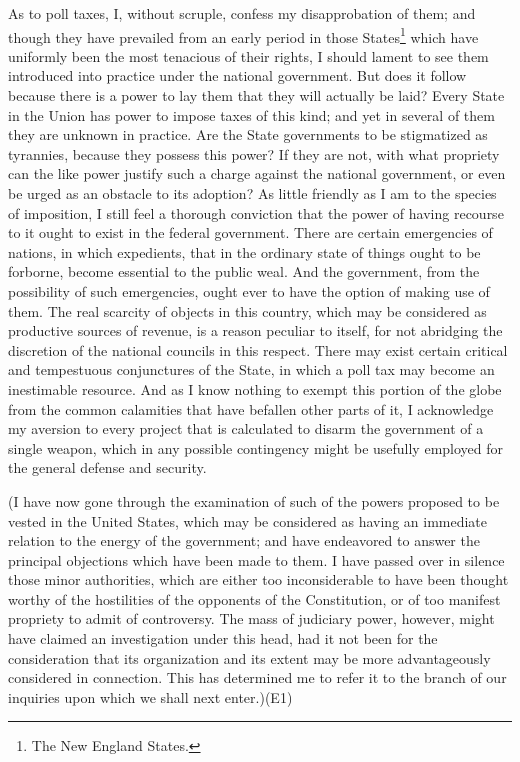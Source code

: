 As to poll taxes, I, without scruple, confess my disapprobation of them; and though they have prevailed from an early period in those States\footnote{The New England States.} which have uniformly been the most tenacious of their rights, I should lament to see them introduced into practice under the national government. But does it follow because there is a power to lay them that they will actually be laid? Every State in the Union has power to impose taxes of this kind; and yet in several of them they are unknown in practice. Are the State governments to be stigmatized as tyrannies, because they possess this power? If they are not, with what propriety can the like power justify such a charge against the national government, or even be urged as an obstacle to its adoption? As little friendly as I am to the species of imposition, I still feel a thorough conviction that the power of having recourse to it ought to exist in the federal government. There are certain emergencies of nations, in which expedients, that in the ordinary state of things ought to be forborne, become essential to the public weal. And the government, from the possibility of such emergencies, ought ever to have the option of making use of them. The real scarcity of objects in this country, which may be considered as productive sources of revenue, is a reason peculiar to itself, for not abridging the discretion of the national councils in this respect. There may exist certain critical and tempestuous conjunctures of the State, in which a poll tax may become an inestimable resource. And as I know nothing to exempt this portion of the globe from the common calamities that have befallen other parts of it, I acknowledge my aversion to every project that is calculated to disarm the government of a single weapon, which in any possible contingency might be usefully employed for the general defense and security.

(I have now gone through the examination of such of the powers proposed to be vested in the United States, which may be considered as having an immediate relation to the energy of the government; and have endeavored to answer the principal objections which have been made to them. I have passed over in silence those minor authorities, which are either too inconsiderable to have been thought worthy of the hostilities of the opponents of the Constitution, or of too manifest propriety to admit of controversy. The mass of judiciary power, however, might have claimed an investigation under this head, had it not been for the consideration that its organization and its extent may be more advantageously considered in connection. This has determined me to refer it to the branch of our inquiries upon which we shall next enter.)(E1)


